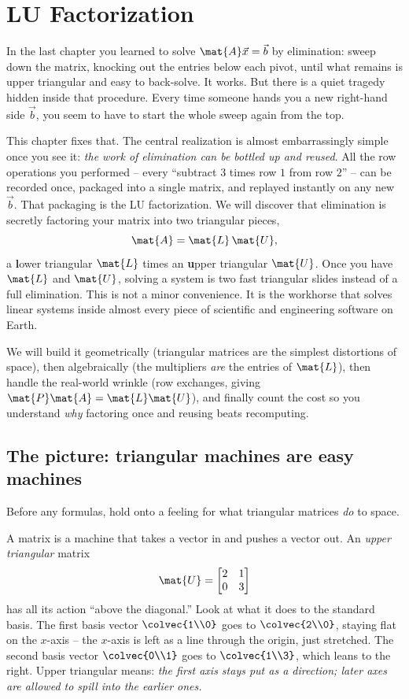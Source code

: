 \chapter{LU Factorization}

In the last chapter you learned to solve $\mat{A}\vec{x} = \vec{b}$ by elimination:
sweep down the matrix, knocking out the entries below each pivot, until what remains is
upper triangular and easy to back-solve. It works. But there is a quiet tragedy hidden
inside that procedure. Every time someone hands you a new right-hand side $\vec{b}$, you
seem to have to start the whole sweep again from the top.

This chapter fixes that. The central realization is almost embarrassingly simple once you
see it: \emph{the work of elimination can be bottled up and reused}. All the row
operations you performed -- every ``subtract $3$ times row $1$ from row $2$'' -- can be
recorded once, packaged into a single matrix, and replayed instantly on any new $\vec{b}$.
That packaging is the LU factorization. We will discover that elimination is secretly
factoring your matrix into two triangular pieces,
\[
  \mat{A} = \mat{L}\,\mat{U},
\]
a \textbf{l}ower triangular $\mat{L}$ times an \textbf{u}pper triangular $\mat{U}$. Once
you have $\mat{L}$ and $\mat{U}$, solving a system is two fast triangular slides instead of
a full elimination. This is not a minor convenience. It is the workhorse that solves linear
systems inside almost every piece of scientific and engineering software on Earth.

We will build it geometrically (triangular matrices are the simplest distortions of space),
then algebraically (the multipliers \emph{are} the entries of $\mat{L}$), then handle the
real-world wrinkle (row exchanges, giving $\mat{P}\mat{A} = \mat{L}\mat{U}$), and finally
count the cost so you understand \emph{why} factoring once and reusing beats recomputing.

\section{The picture: triangular machines are easy machines}
\label{ch09:triangular-picture}

Before any formulas, hold onto a feeling for what triangular matrices \emph{do} to space.

A matrix is a machine that takes a vector in and pushes a vector out. An \emph{upper
triangular} matrix
\[
  \mat{U} = \begin{bmatrix} 2 & 1 \\ 0 & 3 \end{bmatrix}
\]
has all its action ``above the diagonal.'' Look at what it does to the standard basis. The
first basis vector $\colvec{1\\0}$ goes to $\colvec{2\\0}$, staying flat on the
$x$-axis -- the $x$-axis is left as a line through the origin, just stretched. The second
basis vector $\colvec{0\\1}$ goes to $\colvec{1\\3}$, which leans to the right. Upper
triangular means: \emph{the first axis stays put as a direction; later axes are allowed to
spill into the earlier ones.}

